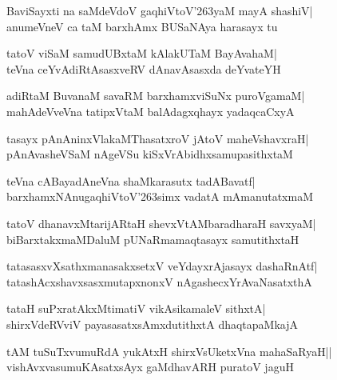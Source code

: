 \documentclass[twoside,12pt,openright]{book}
\def\S{\char'263}
\newcounter{shloka}[chapter]
\begin{document}
\begin{shloka}%
BaviSayxti na saMdeVdoV gaqhiVtoV\S yaM mayA shashiV|\\
anumeVneV ca taM barxhAmx BUSaNAya harasayx tu
\end{shloka}

\begin{shloka}%
tatoV viSaM samudUBxtaM kAlakUTaM BayAvahaM|\\
teVna ceYvAdiRtAsasxveRV dAnavAsasxda deYvateYH
\end{shloka}

\begin{shloka}%
adiRtaM BuvanaM savaRM barxhamxviSuNx puroVgamaM|\\
mahAdeVveVna tatipxVtaM balAdagxqhayx yadaqcaCxyA
\end{shloka}

\begin{shloka}%
tasayx pAnAninxVlakaMThasatxroV jAtoV maheVshavxraH|\\
pAnAvasheVSaM nAgeVSu kiSxVrAbidhxsamupasithxtaM
\end{shloka}

\begin{shloka}%
teVna cABayadAneVna shaMkarasutx tadABavatf|\\
barxhamxNAnugaqhiVtoV\S simx vadatA mAmanutatxmaM
\end{shloka}

\begin{shloka}%
tatoV dhanavxMtarijARtaH shevxVtAMbaradharaH savxyaM|\\
biBarxtakxmaMDaluM pUNaRmamaqtasayx samutithxtaH
\end{shloka}

\begin{shloka}%
tatasasxvXsathxmanasakxsetxV veYdayxrAjasayx dashaRnAtf|\\
tatashAcxshavxsasxmutapxnonxV nAgashecxYrAvaNasatxthA
\end{shloka}

\begin{shloka}%
tataH suPxratAkxMtimatiV vikAsikamaleV sithxtA|\\
shirxVdeRVviV payasasatxsAmxdutithxtA dhaqtapaMkajA
\end{shloka}

\begin{shloka}%
tAM tuSuTxvumuRdA yukAtxH shirxVsUketxVna mahaSaRyaH||\\
vishAvxvasumuKAsatxsAyx gaMdhavARH puratoV jaguH
\end{shloka}
\end{document}
